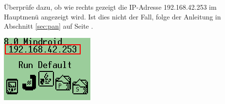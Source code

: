 \documentclass[
	12pt,
	article,
	type=bsc, %
	colorbacktitle,
	instlogo,
	accentcolor=tud1c,
	draft,
	german,
	twoside
]{tudexercise}
\begin{document}
	
	\begin{enumerate}
	
	\begin{minipage}{.45\textwidth}
	\item Überprüfe dazu, ob wie rechts gezeigt die IP-Adresse 192.168.42.253 im Hauptmenü angezeigt wird. Ist dies nicht der Fall, folge der Anleitung in Abschnitt \ref{sec:pan} auf Seite \pageref{sec:pan}. 
	\end{minipage}
	\hspace{.05\textwidth}
	\begin{minipage}{.45\textwidth}
	\includegraphics[width=.8\textwidth]{img/ev3_main.png}
	\end{minipage}
	

\end{enumerate}
\end{document}
